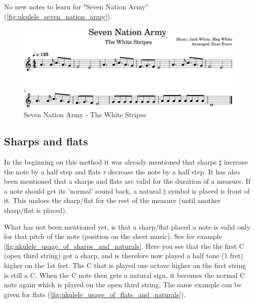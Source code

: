 \newpage

No new notes to learn for "Seven Nation Army" (\autoref{fig:ukulele_seven_nation_army}).

\begin{figure}[h]
	\centering
	\includegraphics[width=\textwidth]{../../MuseScore/Ukulele/Ukulele_SevenNationArmy-TheWhiteStripes.png}
	\caption{Seven Nation Army - The White Stripes}
	\label{fig:ukulele_seven_nation_army}
\end{figure}

\newpage

\subsection{Sharps and flats}

In the beginning on this method it was already mentioned that sharps $\sharp$ increase the note by a half step and flats $\flat$ decrease the note by a half step. It has also been mentioned that a sharps and flats are valid for the duration of a measure. If a note should get its 'normal' sound back, a natural $\natural$ symbol is placed is front of it. This undoes the sharp/flat for the rest of the measure (until another sharp/flat is placed).

What has not been mentioned yet, is that a sharp/flat placed a note is valid only for that pitch of the note (position on the sheet music). See for example \autoref{fig:ukulele_usage_of_sharps_and_naturals}. Here you see that the the first C (open third string) got a sharp, and is therefore now played a half tone (1 fret) higher on the 1st fret. The C that is played one octave higher on the first string is still a C. When the C note then gets a natural sign, it becomes the normal C note again which is played on the open third string. The same example can be given for flats (\autoref{fig:ukulele_usage_of_flats_and_naturals}).

